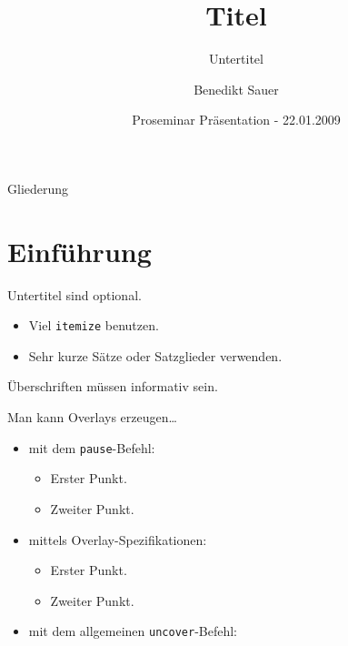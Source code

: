 \documentclass{beamer}
\title[Kurzversion des Titels]{Titel}
\subtitle{Untertitel}
\author{Benedikt Sauer}
\institute{}
\date[Proseminar Präsentation]{Proseminar Präsentation - 22.01.2009}
\begin{document}
\begin{frame}
  \titlepage
\end{frame}

\begin{frame}{Gliederung}
  \tableofcontents
\end{frame}


\section{Einführung}
\begin{frame}{}{Untertitel sind optional.}

  \begin{itemize}
  \item
    Viel \texttt{itemize} benutzen.
  \item
    Sehr kurze Sätze oder Satzglieder verwenden.
  \end{itemize}
\end{frame}

\begin{frame}{Überschriften müssen informativ sein.}

  Man kann Overlays erzeugen\dots
  \begin{itemize}
  \item mit dem \texttt{pause}-Befehl:
    \begin{itemize}
    \item
      Erster Punkt.
      \pause
    \item    
      Zweiter Punkt.
    \end{itemize}
  \item
    mittels Overlay-Spezifikationen:
    \begin{itemize}
    \item<3->
      Erster Punkt.
    \item<4->
      Zweiter Punkt.
    \end{itemize}
  \item
    mit dem allgemeinen \texttt{uncover}-Befehl:
    \begin{itemize}
    \end{itemize}
  \end{itemize}
\end{frame}
\end{document}
